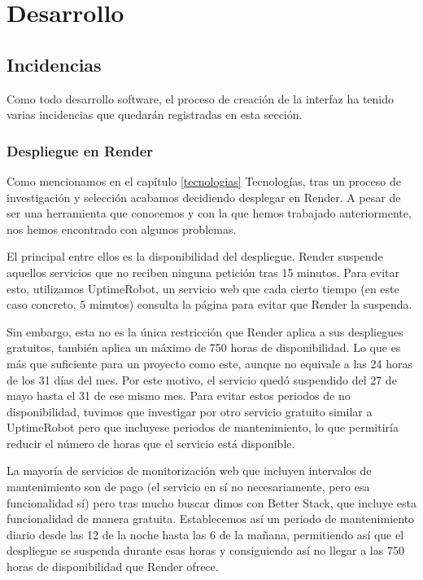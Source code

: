 \chapter{Desarrollo}\label{desarrollo}

\section{Incidencias}

Como todo desarrollo software, el proceso de creación de la interfaz ha tenido varias incidencias que quedarán registradas en esta sección.

\subsection{Despliegue en Render}

Como mencionamos en el capítulo \ref{tecnologias} Tecnologías, tras un proceso de investigación y selección acabamos decidiendo desplegar en Render. A pesar de ser una herramienta que conocemos y con la que hemos trabajado anteriormente, nos hemos encontrado con algunos problemas.

El principal entre ellos es la disponibilidad del despliegue. Render suspende aquellos servicios que no reciben ninguna petición tras 15 minutos. Para evitar esto, utilizamos UptimeRobot, un servicio web que cada cierto tiempo (en este caso concreto, 5 minutos) consulta la página para evitar que Render la suspenda.

Sin embargo, esta no es la única restricción que Render aplica a sus despliegues gratuitos, también aplica un máximo de 750 horas de disponibilidad. Lo que es más que suficiente para un proyecto como este, aunque no equivale a las 24 horas de los 31 días del mes. Por este motivo, el servicio quedó suspendido del 27 de mayo hasta el 31 de ese mismo mes. Para evitar estos periodos de no disponibilidad, tuvimos que investigar por otro servicio gratuito similar a UptimeRobot pero que incluyese periodos de mantenimiento, lo que permitiría reducir el número de horas que el servicio está disponible.

La mayoría de servicios de monitorización web que incluyen intervalos de mantenimiento son de pago (el servicio en sí no necesariamente, pero esa funcionalidad sí) pero tras mucho buscar dimos con Better Stack, que incluye esta funcionalidad de manera gratuita. Establecemos así un periodo de mantenimiento diario desde las 12 de la noche hasta las 6 de la mañana, permitiendo así que el despliegue se suspenda durante esas horas y consiguiendo así no llegar a las 750 horas de disponibilidad que Render ofrece.



